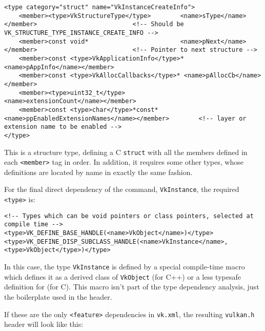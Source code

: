 \documentclass{article}
\def\code#1{{\tt #1}}
\def\tag#1{{\tt <#1>\index{<#1>}}}
\begin{document}
\begin{verbatim}
<type category="struct" name="VkInstanceCreateInfo">
    <member><type>VkStructureType</type>        <name>sType</name></member>                          <!-- Should be VK_STRUCTURE_TYPE_INSTANCE_CREATE_INFO -->
    <member>const void*                         <name>pNext</name></member>                          <!-- Pointer to next structure -->
    <member>const <type>VkApplicationInfo</type>* <name>pAppInfo</name></member>
    <member>const <type>VkAllocCallbacks</type>* <name>pAllocCb</name></member>
    <member><type>uint32_t</type>               <name>extensionCount</name></member>
    <member>const <type>char</type>*const*      <name>ppEnabledExtensionNames</name></member>        <!-- layer or extension name to be enabled -->
</type>
\end{verbatim}

\noindent This is a structure type, defining a C \code{struct} with all the
members defined in each \tag{member} tag in order. In addition, it requires
some other types, whose definitions are located by name in exactly the same
fashion.

For the final direct dependency of the command, \code{VkInstance}, the
required \tag{type} is:

\begin{verbatim}
<!-- Types which can be void pointers or class pointers, selected at compile time -->
<type>VK_DEFINE_BASE_HANDLE(<name>VkObject</name>)</type>
<type>VK_DEFINE_DISP_SUBCLASS_HANDLE(<name>VkInstance</name>, <type>VkObject</type>)</type>
\end{verbatim}

\noindent In this case, the type \code{VkInstance} is defined by a special
compile-time macro which defines it as a derived class of \code{VkObject}
(for C++) or a less typesafe definition for (for C). This macro isn't part
of the type dependency analysis, just the boilerplate used in the header.

If these are the only \tag{feature} dependencies in \code{vk.xml}, the
resulting \code{vulkan.h} header will look like this:
\end{document}

